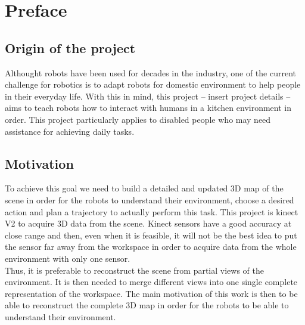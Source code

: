
\chapter{Preface}


\section{Origin of the project}

Althought robots have been used for decades in the industry, one of the current challenge for robotics is to adapt robots for domestic environment to help people in their everyday life. With this in mind, this project -- insert project details -- aims to teach robots how to interact with humans in a kitchen environment in order. This project particularly applies to disabled people who may need assistance for achieving daily tasks.   

\section{Motivation}

To achieve this goal we need to build a detailed and updated 3D map of the scene in order for the robots to understand their environment, choose a desired action and plan a trajectory to actually perform this task. This project is kinect V2 to acquire 3D data from the scene. Kinect sensors have a good accuracy at close range and then, even when it is feasible, it will not be the best idea to put the sensor far away from the workspace in order to acquire data from the whole environment with only one sensor. \\
Thus, it is preferable to reconstruct the scene from partial views of the environment. It is then needed to merge different views into one single complete representation of the workspace. The main motivation of this work is then to be able to reconstruct the complete 3D map in order for the robots to be able to understand their environment.

